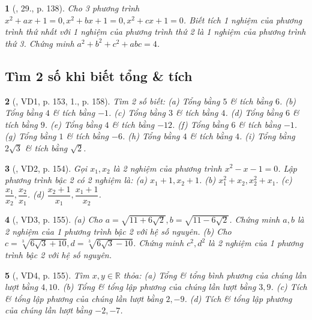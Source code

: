 \documentclass{article}
\newtheorem{baitoan}{}
\begin{document}
\begin{baitoan}[\cite{Thu_Viet_Minh_ptb2}, 29., p. 138]
	Cho 3 phương trình $x^2 + ax + 1 = 0,x^2 + bx + 1 = 0,x^2 + cx + 1 = 0$. Biết tích 1 nghiệm của phương trình thứ nhất với 1 nghiệm của phương trình thứ 2 là 1 nghiệm của phương trình thứ 3. Chứng minh $a^2 + b^2 + c^2 + abc = 4$.
\end{baitoan}

\subsection{Tìm 2 số khi biết tổng \& tích}

\begin{baitoan}[\cite{Thu_Viet_Minh_ptb2}, VD1, p. 153, 1., p. 158]
	Tìm 2 số biết: (a) Tổng bằng $5$ \& tích bằng $6$. (b) Tổng bằng $4$ \& tích bằng $-1$. (c) Tổng bằng $3$ \& tích bằng $4$. (d) Tổng bằng $6$ \& tích bằng $9$. (e) Tổng bằng $4$ \& tích bằng $-12$. (f) Tổng bằng $6$ \& tích bằng $-1$. (g) Tổng bằng $1$ \& tích bằng $-6$. (h) Tổng bằng $4$ \& tích bằng $4$. (i) Tổng bằng $2\sqrt{3}$ \& tích bằng $\sqrt{2}$.
\end{baitoan}

\begin{baitoan}[\cite{Thu_Viet_Minh_ptb2}, VD2, p. 154]
	Gọi $x_1,x_2$ là 2 nghiệm của phương trình $x^2 - x - 1 = 0$. Lập phương trình bậc 2 có 2 nghiệm là: (a) $x_1 + 1,x_2 + 1$. (b) $x_1^2 + x_2,x_2^2 + x_1$. (c) $\dfrac{x_1}{x_2},\dfrac{x_2}{x_1}$. (d) $\dfrac{x_2 + 1}{x_1},\dfrac{x_1 + 1}{x_2}$.
\end{baitoan}

\begin{baitoan}[\cite{Thu_Viet_Minh_ptb2}, VD3, p. 155]
	(a) Cho $a = \sqrt{11 + 6\sqrt{2}},b = \sqrt{11 - 6\sqrt{2}}$. Chứng minh $a,b$ là 2 nghiệm của 1 phương trình bậc 2 với hệ số nguyên. (b) Cho $c = \sqrt[3]{6\sqrt{3} + 10},d = \sqrt[3]{6\sqrt{3} - 10}$. Chứng minh $c^2,d^2$ là 2 nghiệm của 1 phương trình bậc 2 với hệ số nguyên.
\end{baitoan}

\begin{baitoan}[\cite{Thu_Viet_Minh_ptb2}, VD4, p. 155]
	Tìm $x,y\in\mathbb{R}$ thỏa: (a) Tổng \& tổng bình phương của chúng lần lượt bằng $4,10$. (b) Tổng \& tổng lập phương của chúng lần lượt bằng $3,9$. (c) Tích \& tổng lập phương của chúng lần lượt bằng $2,-9$. (d) Tích \& tổng lập phương của chúng lần lượt bằng $-2,-7$.
\end{baitoan}
\end{document}
